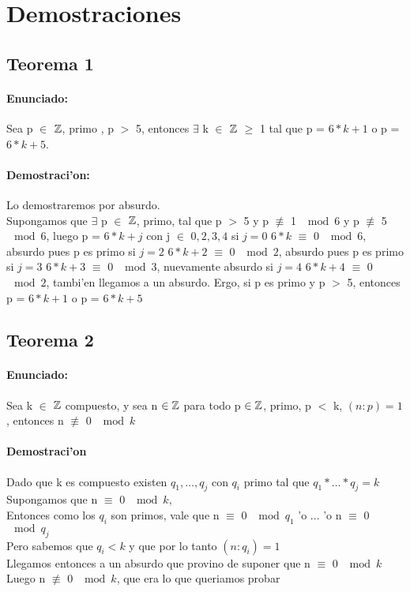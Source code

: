 \section{Demostraciones}
\subsection{Teorema 1}
\paragraph{Enunciado:}
Sea p $\in$ ${\mathbb Z}$, primo , p $>$ 5, entonces $\exists$ k $\in$ ${\mathbb Z}$ $\geq$ 1  tal que p = $6*k+1$ o p = $6*k +5$.
\paragraph{Demostraci'on:}
Lo demostraremos por absurdo.\\ Supongamos que $\exists$ p $\in$ ${\mathbb Z}$, primo, tal que p $>$ 5 y p $\not\equiv$ 1  $\mod{6}$ y p
$\not\equiv$ 5  $\mod{6}$, luego p = $6*k + j$ con j $\in$ ${0,2,3,4}$
si $j = 0$
$6*k$ $\equiv$ 0  $\mod{6}$, absurdo pues p es primo
si $j = 2$
$6*k + 2$ $\equiv$ 0  $\mod{2}$, absurdo pues p es primo 
si $j = 3$
$6*k + 3$ $\equiv$ 0  $\mod{3}$, nuevamente absurdo
si $j = 4$
$6*k + 4$ $\equiv$ 0  $\mod{2}$, tambi'en llegamos a un absurdo.
Ergo, si p es primo y p $>$ 5, entonces p = $6*k+1$ o p = $6*k +5$

\subsection{Teorema 2}
\paragraph{Enunciado:}
Sea k $\in$ ${\mathbb Z}$ compuesto, y sea n ${\in {\mathbb Z}}$ para todo p ${\in {\mathbb Z}}$, primo, p $<$ k, $(n:p) = 1$, entonces n $\not\equiv$ 0 $\mod{k}$
\paragraph{Demostraci'on}
Dado que k es compuesto existen $q_1,\ldots,q_j$ con $q_i$ primo tal que $q_1*\ldots*q_j = k$ \\
Supongamos que n $\equiv$ 0 $\mod{k}$,\\
Entonces como los $q_i$ son primos, vale que n $\equiv$ 0 $\mod{q_1}$ 'o ... 'o n $\equiv$ 0 $\mod{q_j}$ \\
Pero sabemos que $q_i < k$ y que por lo tanto $(n:q_{i}) = 1$ \\
Llegamos entonces a un absurdo que provino de suponer que  n $\equiv$ 0 $\mod{k}$ \\ 
Luego n $\not\equiv$ 0 $\mod{k}$, que era lo que queriamos probar

